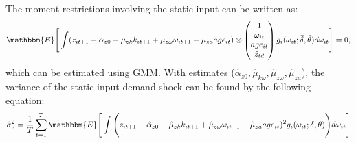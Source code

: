 \documentclass{article}
\begin{document}
\begin{enumerate}
     The moment restrictions involving the static input can be written as:
     \begin{equation}\label{staticimc}
     \mathbbm{E}\Bigg[\int(z_{it+1}-\alpha_{z0}-\mu_{zk}k_{it+1}+\mu_{z\omega}\omega_{it+1}-\mu_{za}age_{it})\otimes
     \begin{pmatrix}
     1\\
     \omega_{it}\\
     age_{it}\\
     \tilde{z}_{td}
     \end{pmatrix}
     g_{i}(\omega_{it};\bar{\delta},\bar{\theta})d\omega_{it}
     \Bigg]=0,
     \end{equation}
     which can be estimated using GMM. With estimates ($\hat{\alpha}_{z0}, \hat{\mu}_{k\omega}, \hat{\mu}_{z\omega},\hat{\mu}_{za}$), the variance of the static input demand shock can be found by the following equation:
     \begin{equation}\label{staticvar}
     \hat{\sigma}^{2}_{z}=\frac{1}{T}\sum_{t=1}^{T}\mathbbm{E}\Bigg[\int\Bigg(z_{it+1}-\hat{\alpha}_{z0}-\hat{\mu}_{zk}k_{it+1}+\hat{\mu}_{z\omega}\omega_{it+1}-\hat{\mu}_{za}age_{it})^{2}g_{i}(\omega_{it};\bar{\delta},\bar{\theta})\Bigg)d\omega_{it}\Bigg]
     \end{equation}
\end{enumerate}

\pagebreak
\newpage



\end{document}
